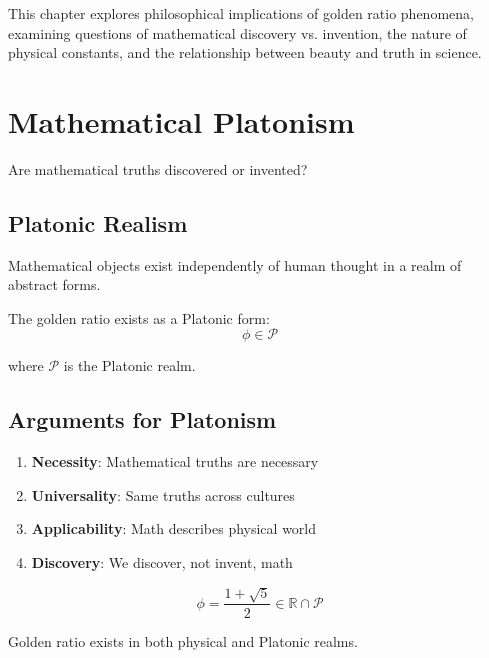This chapter explores philosophical implications of golden ratio phenomena, examining questions of mathematical discovery vs. invention, the nature of physical constants, and the relationship between beauty and truth in science.

\section{Mathematical Platonism}

Are mathematical truths discovered or invented?

\subsection{Platonic Realism}

\begin{definition}[Platonism]
\label{fa_31:def:platonism}
Mathematical objects exist independently of human thought in a realm of abstract forms.
\end{definition}

\begin{theorem}
\label{fa_31:thm:platonic-golden}
The golden ratio exists as a Platonic form:
\begin{equation}
\phi \in \mathcal{P}
\end{equation}

where $\mathcal{P}$ is the Platonic realm.
\end{theorem}

\subsection{Arguments for Platonism}

\begin{enumerate}
    \item \textbf{Necessity}: Mathematical truths are necessary
    \item \textbf{Universality}: Same truths across cultures
    \item \textbf{Applicability}: Math describes physical world
    \item \textbf{Discovery}: We discover, not invent, math
\end{enumerate}

\begin{proposition}
\label{fa_31:prop:golden-platonism}
\begin{equation}
\phi = \frac{1+\sqrt{5}}{2} \in \mathbb{R} \cap \mathcal{P}
\end{equation}

Golden ratio exists in both physical and Platonic realms.
\end{proposition}

